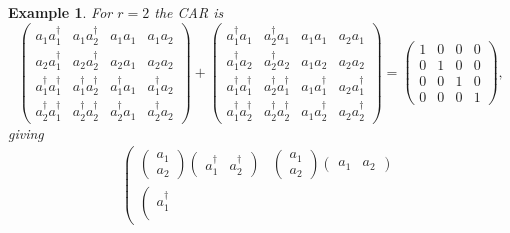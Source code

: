\documentclass[aps, preprint]{revtex4}
\newtheorem{example}[theorem]{Example}
\begin{document}
\begin{example}
For $r =2$ the CAR is
\begin{equation}\left (\begin{array}{cccc}a_{1} a_{1}^{ \dag } & a_{1} a_{2}^{ \dag } & a_{1} a_{1} & a_{1} a_{2} \\
a_{2} a_{1}^{ \dag } & a_{2} a_{2}^{ \dag } & a_{2} a_{1} & a_{2} a_{2} \\
a_{1}^{ \dag } a_{1}^{ \dag } & a_{1}^{ \dag } a_{2}^{ \dag } & a_{1}^{ \dag } a_{1} & a_{1}^{ \dag } a_{2} \\
a_{2}^{ \dag } a_{1}^{ \dag } & a_{2}^{ \dag } a_{2}^{ \dag } & a_{2}^{ \dag } a_{1} & a_{2}^{ \dag } a_{2}\end{array}\right ) +\left (\begin{array}{cccc}a_{1}^{ \dag } a_{1} & a_{2}^{ \dag } a_{1} & a_{1} a_{1} & a_{2} a_{1} \\
a_{1}^{ \dag } a_{2} & a_{2}^{ \dag } a_{2} & a_{1} a_{2} & a_{2} a_{2} \\
a_{1}^{ \dag } a_{1}^{ \dag } & a_{2}^{ \dag } a_{1}^{ \dag } & a_{1} a_{1}^{ \dag } & a_{2} a_{1}^{ \dag } \\
a_{1}^{ \dag } a_{2}^{ \dag } & a_{2}^{ \dag } a_{2}^{ \dag } & a_{1} a_{2}^{ \dag } & a_{2} a_{2}^{ \dag }\end{array}\right ) =\left (\begin{array}{cccc}1 & 0 & 0 & 0 \\
0 & 1 & 0 & 0 \\
0 & 0 & 1 & 0 \\
0 & 0 & 0 & 1\end{array}\right )\text{,}
\end{equation}giving
\begin{gather}\left (\begin{array}{cc}\left (\begin{array}{c}a_{1} \\
a_{2}\end{array}\right ) \left (\begin{array}{cc}a_{1}^{ \dag } & a_{2}^{ \dag }\end{array}\right ) & \left (\begin{array}{c}a_{1} \\
a_{2}\end{array}\right ) \left (\begin{array}{cc}a_{1} & a_{2}\end{array}\right ) \\
\left (\begin{array}{c}a_{1}^{ \dag } \\

\end{array}
\end{array}
\end{gather}
\end{example}
\end{document}
